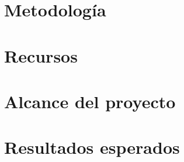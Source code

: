 \documentclass[12pt, letterpaper, spanish, twoside]{article}
\begin{document}
\section{Metodología}


\section{Recursos}


\section{Alcance del proyecto}


\section{Resultados esperados}


\nocite{*} %
\renewcommand{\refname}{Referencias bibliográficas}
\printbibliography%
\end{document}
